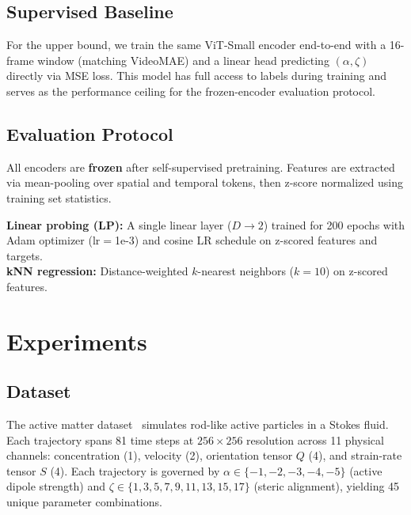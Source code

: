\documentclass{article}
\begin{document}
\subsection{Supervised Baseline}

For the upper bound, we train the same ViT-Small encoder end-to-end with a 16-frame window (matching VideoMAE) and a linear head predicting $(\alpha, \zeta)$ directly via MSE loss. This model has full access to labels during training and serves as the performance ceiling for the frozen-encoder evaluation protocol.

\subsection{Evaluation Protocol}

All encoders are \textbf{frozen} after self-supervised pretraining. Features are extracted via mean-pooling over spatial and temporal tokens, then z-score normalized using training set statistics.

 \textbf{Linear probing (LP):} A single linear layer ($D \to 2$) trained for 200 epochs with Adam optimizer (lr$=$1e-3) and cosine LR schedule on z-scored features and targets. \\
     \textbf{kNN regression:} Distance-weighted $k$-nearest neighbors ($k{=}10$) on z-scored features.

\section{Experiments}

\subsection{Dataset}
The active matter dataset~\cite{ohana2024well} simulates rod-like active particles in a Stokes fluid. Each trajectory spans 81 time steps at $256 \times 256$ resolution across 11 physical channels: concentration (1), velocity (2), orientation tensor $Q$ (4), and strain-rate tensor $S$ (4). Each trajectory is governed by $\alpha \in \{-1, -2, -3, -4, -5\}$ (active dipole strength) and $\zeta \in \{1, 3, 5, 7, 9, 11, 13, 15, 17\}$ (steric alignment), yielding 45 unique parameter combinations.
\end{document}
